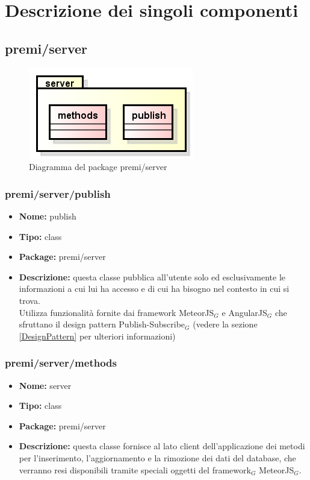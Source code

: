 \section{Descrizione dei singoli componenti}

\subsection{premi/server}
\begin{figure}[H]
\begin{center}
\includegraphics[scale=0.45]{img/diapkg/server.png}
\caption{Diagramma del package premi/server}
\end{center}
\end{figure}

\subsubsection{premi/server/publish}
\begin{itemize}
  \item[] \textbf{Nome:} publish
  \item[] \textbf{Tipo:} class
  \item[] \textbf{Package:} premi/server
  \item[] \textbf{Descrizione:} questa classe pubblica all'utente solo ed esclusivamente le informazioni a cui lui ha accesso e di cui ha bisogno nel contesto in cui si trova. \\ Utilizza funzionalità fornite dai framework MeteorJS$_G$ e AngularJS$_G$ che sfruttano il design pattern Publish-Subscribe$_G$ (vedere la sezione \ref{DesignPattern} per ulteriori informazioni)
\end{itemize}


\subsubsection{premi/server/methods}
\begin{itemize}
  \item[] \textbf{Nome:} server
  \item[] \textbf{Tipo:} class
  \item[] \textbf{Package:} premi/server
  \item[] \textbf{Descrizione:} questa classe fornisce al lato client dell'applicazione dei metodi per l'inserimento, l'aggiornamento e la rimozione dei dati del database, che verranno resi disponibili tramite speciali oggetti del framework$_G$ MeteorJS$_G$.
\end{itemize}





